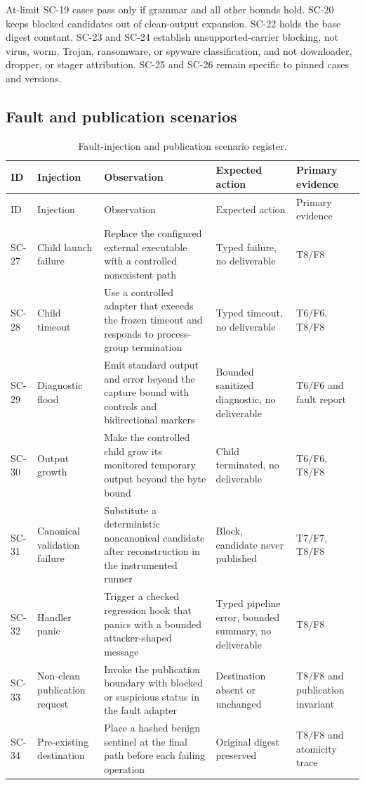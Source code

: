 At-limit SC-19 cases pass only if grammar and all other bounds hold. SC-20 keeps
blocked candidates out of clean-output expansion. SC-22 holds the base digest
constant. SC-23 and SC-24 establish unsupported-carrier blocking, not virus,
worm, Trojan, ransomware, or spyware classification, and not downloader,
dropper, or stager attribution. SC-25 and SC-26 remain specific to pinned cases
and versions.

\subsection{Fault and publication scenarios}
\label{subsec:scenario-fault}

\begingroup
\scriptsize
\setlength{\tabcolsep}{2.5pt}
\begin{longtable}{L{0.08\textwidth}L{0.16\textwidth}L{0.34\textwidth}L{0.11\textwidth}L{0.13\textwidth}}
\caption{Fault-injection and publication scenario register.}
\label{tab:scenario-fault}\\
\toprule
ID & Injection & Observation & Expected action & Primary evidence \\
\midrule
\endfirsthead
\toprule
ID & Injection & Observation & Expected action & Primary evidence \\
\midrule
\endhead
SC-27 & Child launch failure & Replace the configured external executable with a controlled nonexistent path & Typed failure, no deliverable & T8/F8 \\
SC-28 & Child timeout & Use a controlled adapter that exceeds the frozen timeout and responds to process-group termination & Typed timeout, no deliverable & T6/F6, T8/F8 \\
SC-29 & Diagnostic flood & Emit standard output and error beyond the capture bound with controls and bidirectional markers & Bounded sanitized diagnostic, no deliverable & T6/F6 and fault report \\
SC-30 & Output growth & Make the controlled child grow its monitored temporary output beyond the byte bound & Child terminated, no deliverable & T6/F6, T8/F8 \\
SC-31 & Canonical validation failure & Substitute a deterministic noncanonical candidate after reconstruction in the instrumented runner & Block, candidate never published & T7/F7, T8/F8 \\
SC-32 & Handler panic & Trigger a checked regression hook that panics with a bounded attacker-shaped message & Typed pipeline error, bounded summary, no deliverable & T8/F8 \\
SC-33 & Non-clean publication request & Invoke the publication boundary with blocked or suspicious status in the fault adapter & Destination absent or unchanged & T8/F8 and publication invariant \\
SC-34 & Pre-existing destination & Place a hashed benign sentinel at the final path before each failing operation & Original digest preserved & T8/F8 and atomicity trace \\
\bottomrule
\end{longtable}
\endgroup

